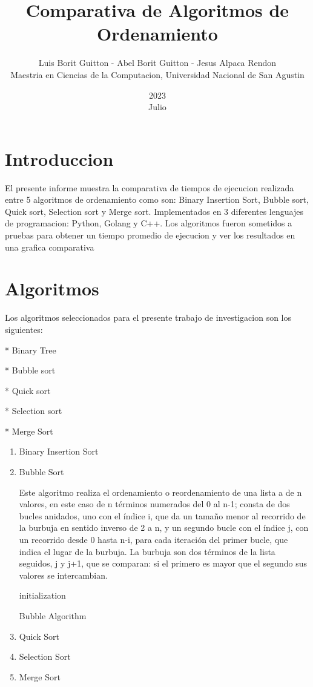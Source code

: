 \documentclass{article} %
\title{Comparativa de Algoritmos de Ordenamiento}
\date{2023\\ Julio}
\author{Luis Borit Guitton - Abel Borit Guitton - Jesus Alpaca Rendon\\ Maestria en Ciencias de la Computacion, Universidad Nacional de San Agustin}
\begin{document}
\maketitle
\section{Introduccion}
El presente informe muestra la comparativa de tiempos de ejecucion realizada entre 5 algoritmos de ordenamiento como son: Binary Insertion Sort, Bubble sort, Quick sort, Selection sort y Merge sort.
Implementados en 3 diferentes lenguajes de programacion: Python, Golang y C++. Los algoritmos fueron sometidos a pruebas para obtener un tiempo promedio de ejecucion y ver los resultados
en una grafica comparativa
\section{Algoritmos}
Los algoritmos seleccionados para el presente trabajo de investigacion son los siguientes:

* Binary Tree

* Bubble sort

* Quick sort

* Selection sort

* Merge Sort

\begin{enumerate}
    \item Binary Insertion Sort
    \item Bubble Sort
    
          Este algoritmo realiza el ordenamiento o reordenamiento de una lista a de n valores, en este caso de n términos numerados del 0 al n-1; consta de dos bucles anidados, uno con el índice i, que da un tamaño menor al recorrido de la burbuja en sentido inverso de 2 a n, y un segundo bucle con el índice j,
          con un recorrido desde 0 hasta n-i, para cada iteración del primer bucle, que indica el lugar de la burbuja. La burbuja son dos términos de la lista seguidos, j y j+1, que se comparan: si el primero es mayor que el segundo sus valores se intercambian.

          \begin{algorithm}[H]
              initialization\;
              \caption{Bubble Algorithm}
          \end{algorithm}

    \item Quick Sort
    \item Selection Sort
    \item Merge Sort
\end{enumerate}
\end{document}
